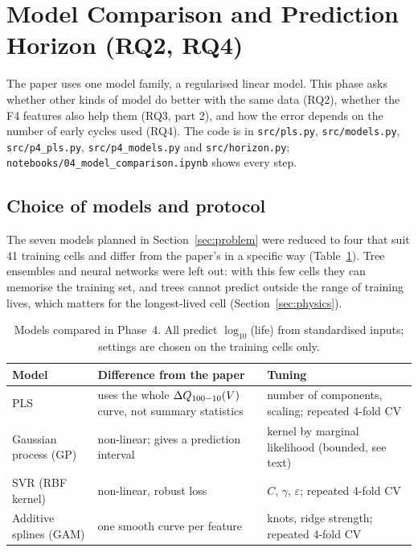 \FloatBarrier
\section{Model Comparison and Prediction Horizon (RQ2, RQ4)}
\label{sec:models}

The paper uses one model family, a regularised linear model. This phase asks
whether other kinds of model do better with the same data (RQ2), whether the
F4 features also help them (RQ3, part 2), and how the error depends on the
number of early cycles used (RQ4). The code is in \texttt{src/pls.py},
\texttt{src/models.py}, \texttt{src/p4\_pls.py}, \texttt{src/p4\_models.py}
and \texttt{src/horizon.py}; \texttt{notebooks/04\_model\_comparison.ipynb}
shows every step.

\subsection{Choice of models and protocol}
The seven models planned in Section~\ref{sec:problem} were reduced to four
that suit 41 training cells and differ from the paper's in a specific way
(Table~\ref{tab:p4models}). Tree ensembles and neural networks were left out:
with this few cells they can memorise the training set, and trees cannot
predict outside the range of training lives, which matters for the
longest-lived cell (Section~\ref{sec:physics}).

\begin{table}[t]
\centering
\caption{Models compared in Phase~4. All predict $\log_{10}$(life) from
standardised inputs; settings are chosen on the training cells only.}
\label{tab:p4models}
\small
\setlength{\tabcolsep}{3pt}
\begin{tabular}{@{}>{\raggedright\arraybackslash}p{}>{\raggedright\arraybackslash}p{}>{\raggedright\arraybackslash}p{}@{}}
\toprule
Model & Difference from the paper & Tuning \\
\midrule
PLS & uses the whole $\Delta Q_{100-10}(V)$ curve, not summary statistics & number of components, scaling; repeated 4-fold CV \\
Gaussian process (GP) & non-linear; gives a prediction interval & kernel by marginal likelihood (bounded, see text) \\
SVR (RBF kernel) & non-linear, robust loss & $C$, $\gamma$, $\varepsilon$; repeated 4-fold CV \\
Additive splines (GAM) & one smooth curve per feature & knots, ridge strength; repeated 4-fold CV \\
\bottomrule
\end{tabular}
\end{table}

